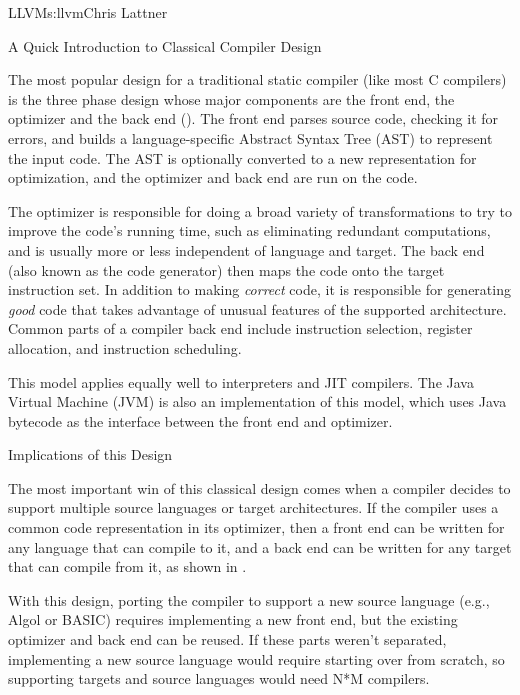 \begin{aosachapter}{LLVM}{s:llvm}{Chris Lattner}
\begin{aosasect1}{A Quick Introduction to Classical Compiler Design}

The most popular design for a traditional static compiler (like most C
compilers) is the three phase design whose major components are the
front end, the optimizer and the back end
(). The front end parses source code, checking
it for errors, and builds a language-specific Abstract Syntax Tree
(AST) to represent the input code.  The AST is optionally converted to
a new representation for optimization, and the optimizer and back end
are run on the code.


The optimizer is responsible for doing a broad variety of
transformations to try to improve the code's running time, such as
eliminating redundant computations, and is usually more or less
independent of language and target.  The back end (also known as the
code generator) then maps the code onto the target instruction set.
In addition to making \emph{correct} code, it is responsible for
generating \emph{good} code that takes advantage of unusual features
of the supported architecture.  Common parts of a compiler back end
include instruction selection, register allocation, and instruction
scheduling.

This model applies equally well to interpreters and JIT compilers.
The Java Virtual Machine (JVM) is also an implementation of this
model, which uses Java bytecode as the interface between the front end
and optimizer.

\begin{aosasect2}{Implications of this Design}

The most important win of this classical design comes when a compiler
decides to support multiple source languages or target
architectures. If the compiler uses a common code representation in
its optimizer, then a front end can be written for any language that
can compile to it, and a back end can be written for any target that
can compile from it, as shown in .


With this design, porting the compiler to support a new source
language (e.g.,  Algol or BASIC) requires implementing a new front end,
but the existing optimizer and back end can be reused.  If these parts
weren't separated, implementing a new source language would require
starting over from scratch, so supporting  targets and
 source languages would need N*M compilers.


\end{aosasect2}
\end{aosasect1}
\end{aosachapter}
